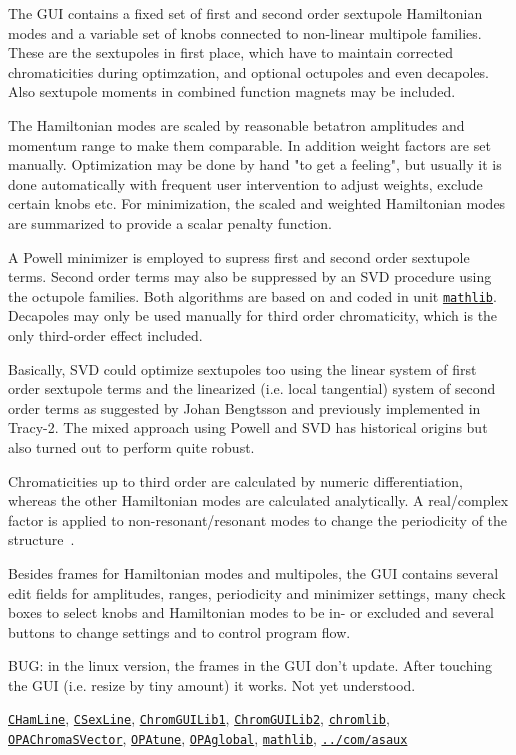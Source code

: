 \documentclass[12pt]{article}
\newcommand\code[1]{{\tt #1}}
\newcommand{\opagui}[1]{\colorbox{blue!20}{\code{#1}}}
\newcommand{\ogui}[1]{\hyperref[#1]{\opagui{#1}}}
\newcommand{\opaguif}[1]{\colorbox{violet!30}{\code{#1}}}
\newcommand{\oguif}[1]{\hyperref[#1]{\opaguif{#1}}}
\newcommand{\opauni}[1]{\colorbox{orange!30}{\code{#1}}}
\newcommand{\ouni}[1]{\hyperref[#1]{\opauni{#1}}}
\newcommand{\uses}[1]{\flushleft {\bf Uses:} #1}
\newcommand{\desc}[1]{#1}
\newcommand{\todo}[1]{{\color{red} #1}}
\begin{document}
\desc{
The GUI contains a fixed set of first and second order sextupole Hamiltonian modes and a variable set of knobs connected to non-linear multipole families. These are the sextupoles in first place, which have to maintain corrected chromaticities during optimzation, and optional octupoles and even decapoles. Also sextupole moments in combined function magnets may be included. 

The Hamiltonian modes are scaled by reasonable  betatron amplitudes and momentum range to make them comparable. In addition weight factors are set manually. Optimization may be done by hand "to get a feeling", but usually it is done automatically with frequent user intervention to adjust weights, exclude certain knobs etc. For minimization, the scaled and weighted Hamiltonian modes are summarized to provide a scalar penalty function.

A Powell minimizer is employed to supress first and second order sextupole terms. Second order terms may also be suppressed by an SVD procedure using the octupole families. Both algorithms are based on \cite{numrec} and coded in unit \ouni{mathlib}. Decapoles may only be used manually for third order chromaticity, which is the only third-order effect included.

\todo{Basically, SVD could optimize sextupoles too using the linear system of first order sextupole terms and the linearized (i.e. local tangential) system of second order terms as suggested by Johan Bengtsson and previously implemented in Tracy-2. The mixed approach using Powell and SVD has historical origins but also turned out to perform quite robust.}

Chromaticities up to third order are calculated by numeric differentiation, whereas the other Hamiltonian modes are calculated analytically. A real/complex factor is applied to non-resonant/resonant modes to change the periodicity of the structure~\cite{inside}. 

Besides frames for Hamiltonian modes and multipoles, the GUI contains several edit fields for amplitudes, ranges, periodicity and minimizer settings, many check boxes to select knobs and Hamiltonian modes to be in- or excluded and several buttons to change settings and to control program flow.


\todo{BUG: in the linux version, the frames in the GUI don't update. After touching the GUI (i.e. resize by tiny amount) it works. Not yet understood.}
}


\uses{
\oguif{CHamLine}, \oguif{CSexLine}, \ouni{ChromGUILib1}, \ouni{ChromGUILib2},  \ouni{chromlib}, \ogui{OPAChromaSVector}, \ogui{OPAtune}, \ouni{OPAglobal}, \ouni{mathlib}, \ouni{../com/asaux}
}
\end{document}
